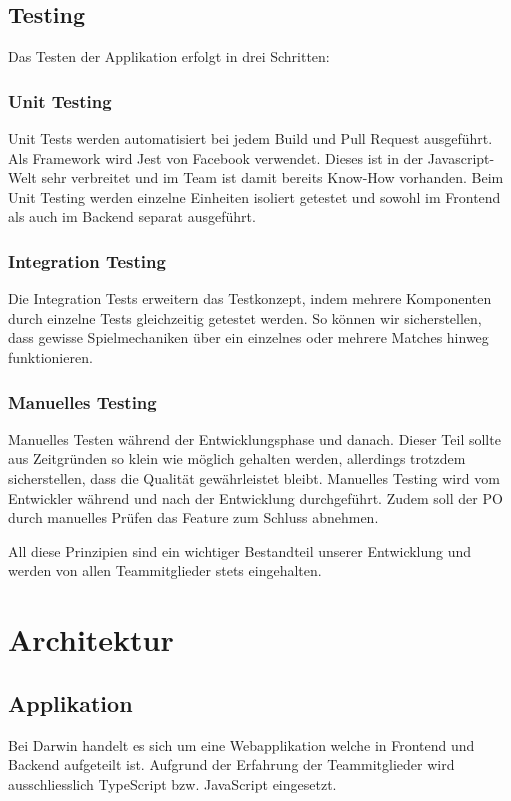 \documentclass[a4paper, 11pt]{scrartcl}
\let\oldsection\section
\renewcommand\section{\clearpage\oldsection}
\begin{document}
\subsection{Testing}
Das Testen der Applikation erfolgt in drei Schritten:

\subsubsection{Unit Testing}
Unit Tests werden automatisiert bei jedem Build und Pull Request ausgeführt.
Als Framework wird Jest von Facebook verwendet. Dieses ist in der Javascript-Welt sehr verbreitet und im Team ist damit bereits Know-How vorhanden.
Beim Unit Testing werden einzelne Einheiten isoliert getestet und sowohl im Frontend als auch im Backend separat ausgeführt.

\subsubsection{Integration Testing}
Die Integration Tests erweitern das Testkonzept, indem mehrere Komponenten durch einzelne Tests gleichzeitig getestet werden. So können wir sicherstellen, dass gewisse Spielmechaniken über ein einzelnes oder mehrere Matches hinweg funktionieren.

\subsubsection{Manuelles Testing}
Manuelles Testen während der Entwicklungsphase und danach. Dieser Teil sollte aus Zeitgründen so klein wie möglich gehalten werden, allerdings trotzdem sicherstellen, dass die Qualität gewährleistet bleibt. Manuelles Testing wird vom Entwickler während und nach der Entwicklung durchgeführt.
Zudem soll der PO durch manuelles Prüfen das Feature zum Schluss abnehmen.

All diese Prinzipien sind ein wichtiger Bestandteil unserer Entwicklung und werden von allen Teammitglieder stets eingehalten.

\section{Architektur}
\subsection{Applikation}
Bei Darwin handelt es sich um eine Webapplikation welche in Frontend und Backend aufgeteilt ist.
Aufgrund der Erfahrung der Teammitglieder wird ausschliesslich TypeScript bzw. JavaScript eingesetzt.
\end{document}
